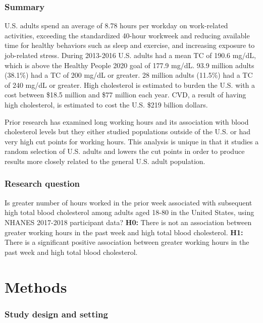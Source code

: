 \documentclass[]{elsarticle} %
\begin{document}
\hypertarget{summary}{%
\subsubsection{Summary}\label{summary}}

U.S. adults spend an average of 8.78 hours per workday on work-related
activities, exceeding the standardized 40-hour workweek and reducing
available time for healthy behaviors such as sleep and exercise, and
increasing exposure to job-related stress. During 2013-2016 U.S. adults
had a mean TC of 190.6 mg/dL, which is above the Healthy People 2020
goal of 177.9 mg/dL. 93.9 million adults (38.1\%) had a TC of 200 mg/dL
or greater. 28 million adults (11.5\%) had a TC of 240 mg/dL or greater.
High cholesterol is estimated to burden the U.S. with a cost between
\$18.5 million and \$77 million each year. CVD, a result of having high
cholesterol, is estimated to cost the U.S. \$219 billion dollars.

Prior research has examined long working hours and its association with
blood cholesterol levels but they either studied populations outside of
the U.S. or had very high cut points for working hours. This analysis is
unique in that it studies a random selection of U.S. adults and lowers
the cut points in order to produce results more closely related to the
general U.S. adult population.

\hypertarget{research-question}{%
\subsubsection{Research question}\label{research-question}}

Is greater number of hours worked in the prior week associated with
subsequent high total blood cholesterol among adults aged 18-80 in the
United States, using NHANES 2017-2018 participant data? \textbf{H0:}
There is not an association between greater working hours in the past
week and high total blood cholesterol. \textbf{H1:} There is a
significant positive association between greater working hours in the
past week and high total blood cholesterol.

\hypertarget{methods}{%
\section{Methods}\label{methods}}

\hypertarget{study-design-and-setting}{%
\subsubsection{Study design and
setting}\label{study-design-and-setting}}
\end{document}
